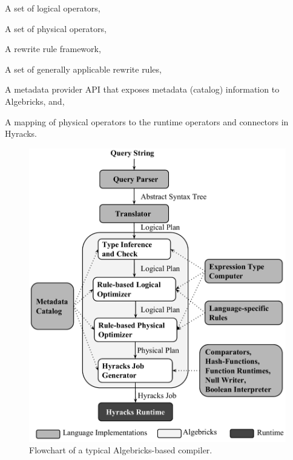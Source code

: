 \begin{list}{}{\leftmargin=1em}\itemsep 0pt \parskip 0pt
\item A set of logical operators,
\item A set of physical operators,
\item A rewrite rule framework,
\item A set of generally applicable rewrite rules,
\item A metadata provider API that exposes metadata (catalog) information to Algebricks, and,
\item A mapping of physical operators to the runtime operators and connectors in Hyracks.
\end{list}

\begin{figure}[tb]
  \centering
  \includegraphics[width=5in]{images/compiler_flow}
  \vspace{-3ex}
  \caption{Flowchart of a typical Algebricks-based compiler.}
  \label{fig:flowchart}
\end{figure}

